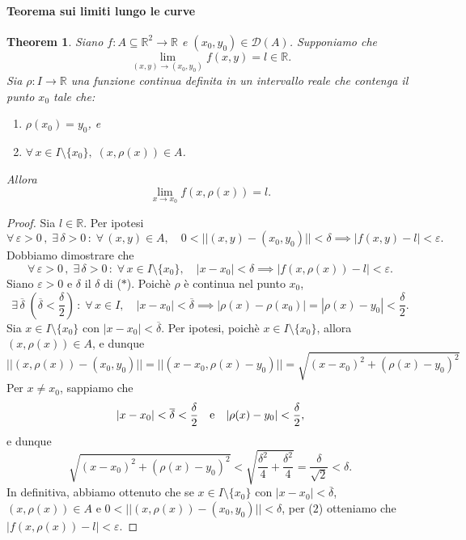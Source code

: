 \documentclass{article}
\theoremstyle{plain}
\newtheorem{thm}{Theorem}[section]
\theoremstyle{definition}
\theoremstyle{remark}
\newcommand{\incfig}[2][\columnwidth]{%
    \def\svgwidth{#1}
    {#2.pdf_tex}
}
\begin{document}
\paragraph{Teorema sui limiti lungo le curve}
\begin{bxthm}
\begin{thm}
    Siano $f:A\subseteq\mathbb{R}^2\to\mathbb{R}$ e $(x_0,y_0)\in\mathcal{D}(A)$.
    Supponiamo che \[\lim_{(x,y)\to(x_0,y_0)}f(x,y)=l\in\mathbb{R}.\]
    Sia $\rho :I\to\mathbb{R}$ una funzione continua definita in un intervallo reale che contenga il punto $x_0$ tale che:
    \begin{enumerate}
        \item $\rho(x_0)=y_0$, e
        \item $\forall\,x\in I\setminus\{x_0\},\;(x,\rho(x))\in A$.
    \end{enumerate} 
    Allora \[\lim_{x\to x_0}f(x,\rho(x))=l.\]
\end{thm}
\end{bxthm}
\begin{proof}
    Sia $l\in\mathbb{R}$. Per ipotesi 
    \[\forall\,\varepsilon>0\,,\;\exists\,\delta>0\,:\;\forall\,(x,y)\in A,\quad 0<||(x,y)-(x_0,y_0)||<\delta\implies|f(x,y)-l|<\varepsilon.\]
    Dobbiamo dimostrare che 
    \[\forall\,\varepsilon>0\,,\;\exists\,\delta>0\,:\;\forall\,x\in I\setminus\{x_0\},\quad|x-x_0|<\delta\implies|f(x,\rho(x))-l|<\varepsilon.\]
    Siano $\varepsilon>0$ e $\delta$ il $\delta$ di ($*$). 
    Poichè $\rho$ è continua nel punto $x_0$, 
    \[\exists\,\overline{\delta}\;(\overline{\delta}<\frac{\delta}{2})\,:\;\forall\, x\in I,\quad |x-x_0|<\overline{\delta}\implies|\rho(x)-\rho(x_0)|=|\rho(x)-y_0|<\frac{\delta}{2}.\]
    Sia $x\in I\setminus\{x_0\}$ con $|x-x_0|<\overline{\delta}$.
    Per ipotesi, poichè $x\in I\setminus\{x_0\}$, allora $(x,\rho(x))\in A$, e dunque
    \[ || (x,\rho(x))-(x_0,y_0) ||=|| (x-x_0, \rho(x)-y_0) ||=\sqrt{(x-x_0)^2+(\rho(x)-y_0)^2}\]
    Per $x\neq x_0$, sappiamo che 
    \[|x-x_0|<\overline{\delta}<\frac{\delta}{2}\quad\textup{e}\quad |\rho(x)-y_0|<\frac{\delta}{2},\]
    e dunque
    \[\sqrt{(x-x_0)^2+(\rho(x)-y_0)^2}<\sqrt{\frac{\delta^2}{4}+\frac{\delta^2}{4}}=\frac{\delta}{\sqrt{2}}<\delta.\]
    In definitiva, abbiamo ottenuto che se $x\in I\setminus\{x_0\}$ con $|x-x_0|<\overline{\delta}$, $(x,\rho(x))\in A$ e $0<||(x,\rho(x))-(x_0,y_0)||<\delta$, per ($2$) otteniamo che $|f(x,\rho(x))-l|<\varepsilon$.
\end{proof}
\end{document}
